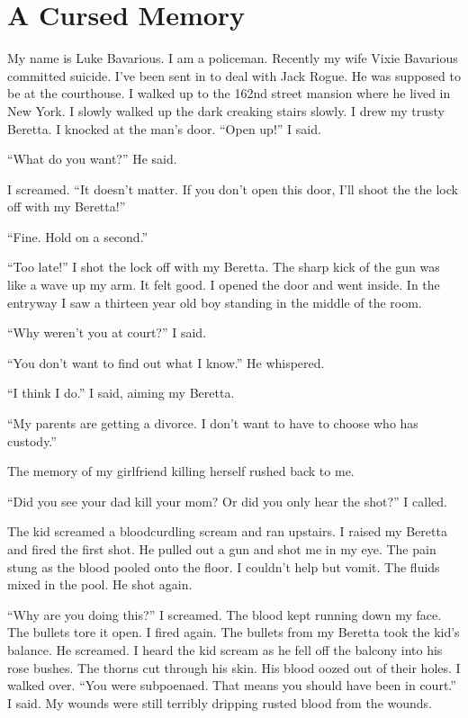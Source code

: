\chapter{A Cursed Memory}



My name is Luke Bavarious. I am a policeman. Recently my wife Vixie
Bavarious committed suicide. I've been sent in to deal with
Jack Rogue. He was supposed to be at the courthouse. I walked up to
the 162nd street mansion where he lived in New York. I slowly
walked up the dark creaking stairs slowly. I drew my trusty
Beretta. I knocked at the man's door. ``Open up!''
I said.

``What do you want?'' He said.

I screamed. ``It doesn't matter. If you don't open
this door, I'll shoot the the lock off with my
Beretta!''

``Fine. Hold on a second.''

``Too late!'' I shot the lock off with my Beretta. The
sharp kick of the gun was like a wave up my arm. It felt good. I
opened the door and went inside. In the entryway I saw a thirteen
year old boy standing in the middle of the room.

``Why weren't you at court?'' I said.

``You don't want to find out what I know.'' He
whispered.

``I think I do.'' I said, aiming my Beretta.

``My parents are getting a divorce. I don't want to have
to choose who has custody.''

The memory of my girlfriend killing herself rushed back to
me.

``Did you see your dad kill your mom? Or did you only hear the
shot?'' I called.

The kid screamed a bloodcurdling scream and ran upstairs. I raised
my Beretta and fired the first shot. He pulled out a gun and shot
me in my eye. The pain stung as the blood pooled onto the floor. I
couldn't help but vomit. The fluids mixed in the pool. He
shot again.

``Why are you doing this?'' I screamed. The blood kept
running down my face. The bullets tore it open. I fired again. The
bullets from my Beretta took the kid's balance. He screamed.
I heard the kid scream as he fell off the balcony into his rose
bushes. The thorns cut through his skin. His blood oozed out of
their holes. I walked over. ``You were subpoenaed. That means
you should have been in court.'' I said. My wounds were still
terribly dripping rusted blood from the wounds.

